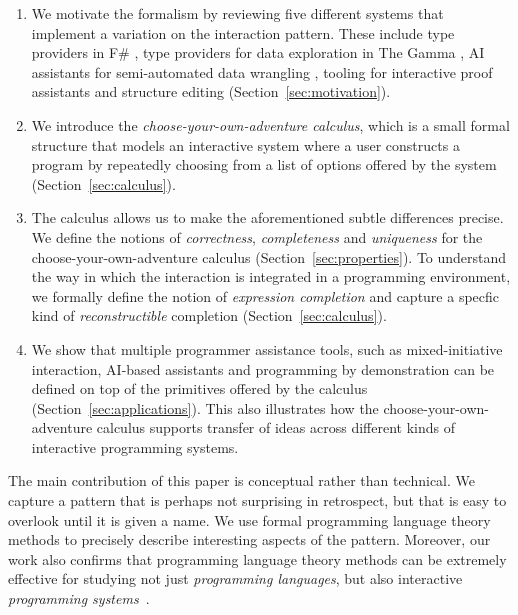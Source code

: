 \documentclass[anonymous, a4paper,UKenglish,cleveref, autoref, thm-restate]{lipics-v2021}
\begin{document}
\begin{enumerate}
\setlength{\itemsep}{5pt}
\item We motivate the formalism by reviewing five different systems that implement a variation on the
interaction pattern. These include type providers in F\# \cite{syme-2013-inforich},
type providers for data exploration in The Gamma \cite{petricek-2022-thegamma,petricek-2017-dotdriven},
AI assistants for semi-automated data wrangling \cite{petricek-2023-aias}, tooling for
interactive proof assistants \cite{altenkirch-1994-alf,brady-2015-idris,verter-2024-mixed}
and structure editing \cite{beckmann-2023-all} (Section~\ref{sec:motivation}).

\item We introduce the \emph{choose-your-own-adventure calculus}, which is a small formal structure
that models an interactive system where a user constructs a program by repeatedly choosing from a list
of options offered by the system (Section~\ref{sec:calculus}).

\item The calculus allows us to make the aforementioned subtle differences precise. We define the
notions of \emph{correctness}, \emph{completeness} and \emph{uniqueness} for the choose-your-own-adventure
calculus (Section~\ref{sec:properties}). To understand the way in which the interaction is
integrated in a programming environment, we formally define the notion of \emph{expression
completion} and capture a specfic kind of \emph{reconstructible} completion (Section~\ref{sec:calculus}).

\item We show that multiple programmer assistance tools, such as mixed-initiative interaction,
AI-based assistants and programming by demonstration can be defined on top of the primitives
offered by the calculus (Section~\ref{sec:applications}). This also illustrates how the
choose-your-own-adventure calculus supports transfer of ideas across different kinds of
interactive programming systems.
\end{enumerate}

The main contribution of this paper is conceptual rather than technical. We capture a
pattern that is perhaps not surprising in retrospect, but that is easy to overlook until it is
given a name. We use formal programming language theory methods to precisely describe
interesting aspects of the pattern. Moreover, our work also confirms that programming
language theory methods can be extremely effective for studying not just \emph{programming
languages}, but also interactive \emph{programming systems}~\cite{jakubovic-2023-techdims}.
\end{document}
